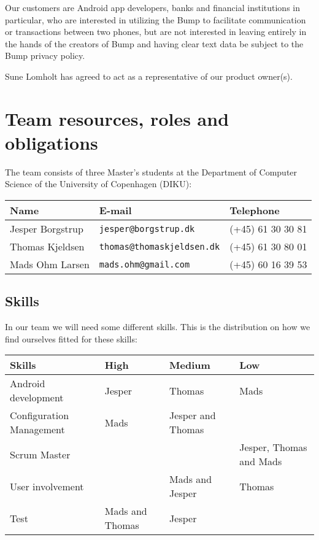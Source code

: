 \documentclass[a4paper,11pt]{article}
\begin{document}
Our customers are Android app developers, banks and financial institutions in particular, who are interested in utilizing the Bump to facilitate communication or transactions between two phones, but are not interested in leaving entirely in the hands of the creators of Bump and having clear text data be subject to the Bump privacy policy.

Sune Lomholt has agreed to act as a representative of our product owner(s).


\section{Team resources, roles and obligations} %
\label{sec:team_resources_roles_and_obligations}
The team consists of three Master's students at the Department of Computer Science of the University of Copenhagen (DIKU): \\

\begin{tabular}{|p{4.5cm}|p{5cm}|p{3.5cm}|}
\hline
\textbf{Name}    & E-mail				          &	Telephone         \\\hline
Jesper Borgstrup & {\tt jesper@borgstrup.dk} 	  & (+45) 61 30 30 81 \\\hline
Thomas Kjeldsen  & {\tt thomas@thomaskjeldsen.dk} & (+45) 61 30 80 01 \\\hline
Mads Ohm Larsen  & {\tt mads.ohm@gmail.com} 	  & (+45) 60 16 39 53 \\\hline
\end{tabular}

\subsection{Skills} %
\label{subsec:skills}
In our team we will need some different skills.
This is the distribution on how we find ourselves fitted for these skills: \\

\begin{tabular}{|p{4.5cm}|p{3cm}|p{3cm}|p{3cm}|}
\hline
\textbf{Skills}          & \textbf{High}   & \textbf{Medium} & \textbf{Low} 					 \\\hline
Android development      & Jesper & Thomas & Mads 					 \\\hline
Configuration Management & Mads & Jesper and Thomas          &      					 \\\hline
Scrum Master             &        &        & Jesper, Thomas and Mads \\\hline 
User involvement         &        & Mads and Jesper & Thomas \\\hline
Test                     & Mads and Thomas   & Jesper & \\\hline
\end{tabular}
\end{document}

